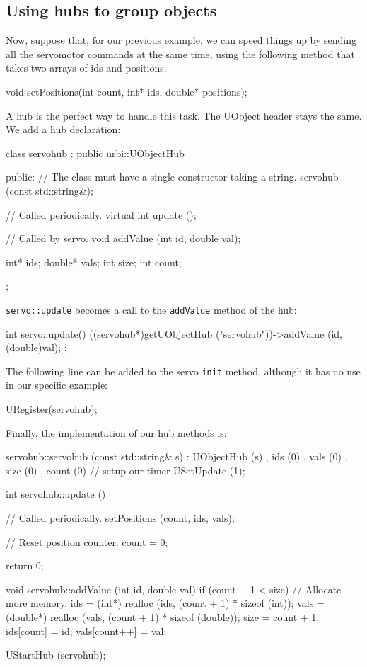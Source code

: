 \subsection{Using hubs to group objects}

Now, suppose that, for our previous example, we can speed things up by
sending all the servomotor commands at the same time, using the
following method that takes two arrays of ids and positions.

\begin{cxx}
void setPositions(int count, int* ids, double* positions);
\end{cxx}

A hub is the perfect way to handle this task. The UObject header stays
the same. We add a hub declaration:

\begin{cxx}
class servohub : public urbi::UObjectHub
{
public:
  // The class must have a single constructor taking a string.
  servohub (const std::string&);

  // Called periodically.
  virtual int update ();

  // Called by servo.
  void addValue (int id, double val);

  int* ids;
  double* vals;
  int size;
  int count;
};
\end{cxx}

\lstinline{servo::update} becomes a call to the \lstinline{addValue}
method of the hub:

\begin{cxx}
int
servo::update()
{
  ((servohub*)getUObjectHub ("servohub"))->addValue (id, (double)val);
};
\end{cxx}

The following line can be added to the servo \lstinline{init} method,
although it has no use in our specific example:

\begin{cxx}
URegister(servohub);
\end{cxx}

Finally, the implementation of our hub methods is:

\begin{cxx}
servohub::servohub (const std::string& s)
  : UObjectHub (s)
  , ids   (0)
  , vals  (0)
  , size  (0)
  , count (0)
{
  // setup our timer
  USetUpdate (1);
}

int
servohub::update ()
{
  // Called periodically.
  setPositions (count, ids, vals);

  // Reset position counter.
  count = 0;

  return 0;
}

void
servohub::addValue (int id, double val)
{
  if (count + 1 < size)
  {
    // Allocate more memory.
    ids = (int*) realloc (ids, (count + 1) * sizeof (int));
    vals = (double*) realloc (vals, (count + 1) * sizeof (double));
    size = count + 1;
  }
  ids[count] = id;
  vals[count++] = val;
}

UStartHub (servohub);
\end{cxx}

